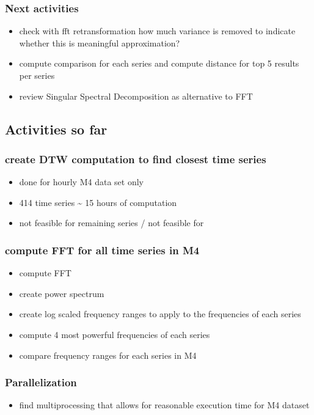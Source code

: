 \documentclass[11pt]{article}
\begin{document}
\subsubsection{Next activities}
\label{sec:orgd327d4c}
\begin{itemize}
\item check with fft retransformation how much variance is removed to indicate whether this is meaningful approximation?
\item compute comparison for each series and compute distance for top 5 results per series
\item review Singular Spectral Decomposition as alternative to FFT
\end{itemize}

\subsection{Activities so far}
\label{sec:orged42cbc}
\subsubsection{create DTW computation to find closest time series}
\label{sec:org1043cce}
\begin{itemize}
\item done for hourly M4 data set only
\item 414 time series \textasciitilde{} 15 hours of computation
\item not feasible for remaining series / not feasible for
\end{itemize}
\subsubsection{compute FFT for all time series in M4}
\label{sec:org31de52a}
\begin{itemize}
\item compute FFT
\item create power spectrum
\item create log scaled frequency ranges to apply to the frequencies of each series
\item compute 4 most powerful frequencies of each series
\item compare frequency ranges for each series in M4
\end{itemize}
\subsubsection{Parallelization}
\label{sec:orgf1d7197}
\begin{itemize}
\item find multiprocessing that allows for reasonable execution time for M4 dataset
\end{itemize}
\end{document}
